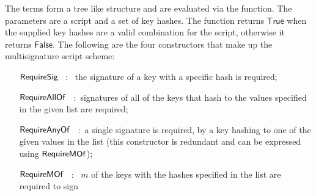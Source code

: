 The terms form a tree like structure and are evaluated via the
 function. The parameters are a script and a set of key
hashes. The function returns $\mathsf{True}$ when the supplied key hashes are
a valid combination for the script, otherwise it returns $\mathsf{False}$.
The following are the four constructors that make up the multisignature script
scheme:

\begin{itemize}
\item[$\mathsf{RequireSig}$] ~:~ the signature of a key with a specific
hash is required;
\item[$\mathsf{RequireAllOf}$] ~:~signatures of all of the keys that hash to the
values specified in the given list are required;
\item[$\mathsf{RequireAnyOf}$] ~:~a single signature is required, by a key hashing
to one of the given values in the list (this constructor is redundant and can
be expressed using $\mathsf{RequireMOf}$);
\item[$\mathsf{RequireMOf}$]~:~ $m$ of the keys with the hashes specified in the list
are required to sign
\end{itemize}

